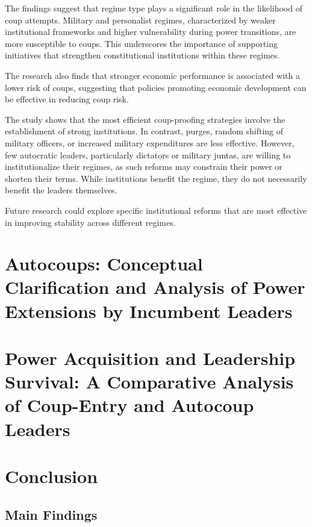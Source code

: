 \documentclass[
  12pt,
]{report}
\begin{document}
The findings suggest that regime type plays a significant role in the
likelihood of coup attempts. Military and personalist regimes,
characterized by weaker institutional frameworks and higher
vulnerability during power transitions, are more susceptible to coups.
This underscores the importance of supporting initiatives that
strengthen constitutional institutions within these regimes.

The research also finds that stronger economic performance is associated
with a lower risk of coups, suggesting that policies promoting economic
development can be effective in reducing coup risk.

The study shows that the most efficient coup-proofing strategies involve
the establishment of strong institutions. In contrast, purges, random
shifting of military officers, or increased military expenditures are
less effective. However, few autocratic leaders, particularly dictators
or military juntas, are willing to institutionalize their regimes, as
such reforms may constrain their power or shorten their terms. While
institutions benefit the regime, they do not necessarily benefit the
leaders themselves.

Future research could explore specific institutional reforms that are
most effective in improving stability across different regimes.

\chapter{Autocoups: Conceptual Clarification and Analysis of Power
Extensions by Incumbent
Leaders}\label{autocoups-conceptual-clarification-and-analysis-of-power-extensions-by-incumbent-leaders}

\chapter{Power Acquisition and Leadership Survival: A Comparative
Analysis of Coup-Entry and Autocoup
Leaders}\label{power-acquisition-and-leadership-survival-a-comparative-analysis-of-coup-entry-and-autocoup-leaders}

\chapter{Conclusion}\label{conclusion-1}

\section{Main Findings}\label{main-findings}
\end{document}
